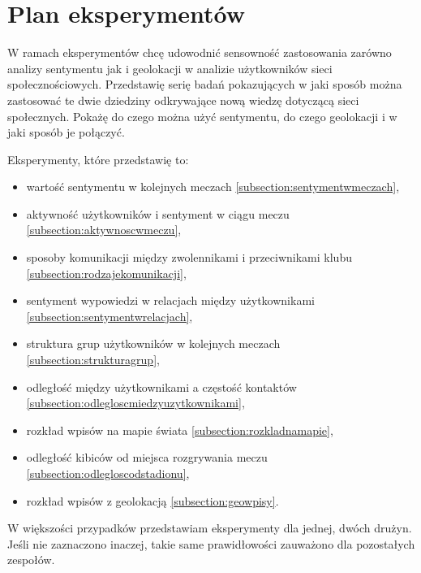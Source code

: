 \section{Plan eksperymentów}
W ramach eksperymentów chcę udowodnić sensowność zastosowania zarówno
analizy sentymentu jak i geolokacji w analizie użytkowników sieci 
społecznościowych. Przedstawię serię badań pokazujących w jaki sposób
można zastosować te dwie dziedziny odkrywające nową wiedzę dotyczącą sieci
społecznych. Pokażę do czego można użyć sentymentu, do czego geolokacji
i w jaki sposób je połączyć.

Eksperymenty, które przedstawię to:
\begin{itemize}
  \item wartość sentymentu w kolejnych meczach 
  \ref{subsection:sentymentwmeczach},
  
  \item aktywność użytkowników i sentyment w ciągu meczu
  \ref{subsection:aktywnoscwmeczu},
  
  \item sposoby komunikacji między zwolennikami i przeciwnikami klubu 
  \ref{subsection:rodzajekomunikacji},
  
  \item sentyment wypowiedzi w relacjach między użytkownikami
  \ref{subsection:sentymentwrelacjach},
  
  \item struktura grup użytkowników w kolejnych meczach
  \ref{subsection:strukturagrup},
  
  \item odległość między użytkownikami a częstość kontaktów
  \ref{subsection:odlegloscmiedzyuzytkownikami},
  
  \item rozkład wpisów na mapie świata
  \ref{subsection:rozkladnamapie},
  
  \item odległość kibiców od miejsca rozgrywania meczu
  \ref{subsection:odlegloscodstadionu},
  
  \item rozkład wpisów z geolokacją
  \ref{subsection:geowpisy}.
\end{itemize}

W większości przypadków przedstawiam eksperymenty dla jednej, dwóch drużyn.
Jeśli nie zaznaczono inaczej, takie same prawidłowości zauważono dla
pozostałych zespołów.






